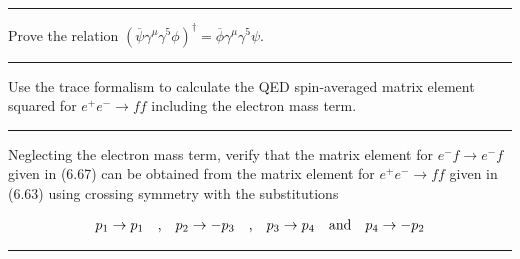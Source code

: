 \noindent\rule{7in}{1.5pt}


\begin{problem}{6.9}
Prove the relation $ \left(\overbar{\psi}\gamma^\mu\gamma^5\phi\right)^\dagger=\overbar{\phi}\gamma^\mu\gamma^5\psi$.
\end{problem}
\begin{solution}

\end{solution}

\noindent\rule{7in}{1.5pt}


\begin{problem}{6.10}
Use the trace formalism to calculate the QED spin-averaged matrix element squared for $e^+e^-\to ff$ including the electron mass term.
\end{problem}
\begin{solution}

\end{solution}

\noindent\rule{7in}{1.5pt}


\begin{problem}{6.11}
Neglecting the electron mass term, verify that the matrix element for $e^- f \to e^- f$ given in (6.67) can be obtained from the matrix element for $e^+e^-\to ff$ given in (6.63) using crossing symmetry with the substitutions

\begin{align*}
    p_1 \to p_1 \quad \text{,} \quad p_2 \to -p_3 \quad \text{,} \quad p_3 \to p_4 \quad \text{and} \quad p_4 \to -p_2 \\
\end{align*}

\end{problem}
\begin{solution}

\end{solution}

\noindent\rule{7in}{1.5pt}


